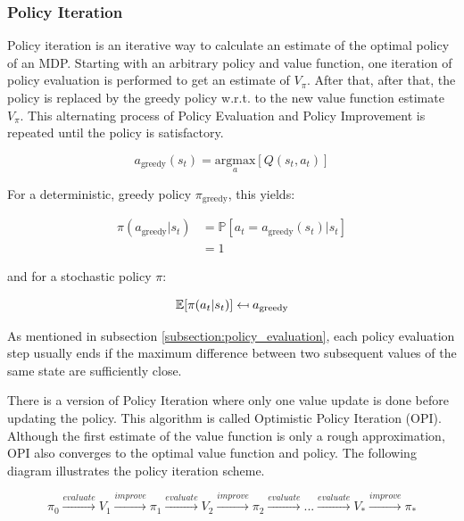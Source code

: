 \subsubsection{Policy Iteration}
\label{sec:PI}
Policy iteration is an iterative way to calculate an estimate of the optimal policy of an MDP. Starting with an arbitrary policy and value function, one iteration of policy evaluation is performed to get an estimate of $V_\pi$. After that, after that, the policy is replaced by the greedy policy w.r.t. to the new value function estimate $V_\pi$. This alternating process of Policy Evaluation and Policy Improvement is repeated until the policy is satisfactory.

\begin{equation}
a_{\text{greedy}}(s_t) = \underset{a}{\text{argmax}}[Q(s_t,a_t)]
\label{eq:get_greedy_action}
\end{equation}

For a deterministic, greedy policy $\pi_{\text{greedy}}$, this yields:

\begin{align}
\pi(a_{\text{greedy}}|s_t)&=\mathbb{P}[a_t=a_{\text{greedy}}(s_t)|s_t] \\ &=1
\end{align}

and for a stochastic policy $\pi$:

\begin{equation}
\mathbb{E}[\pi(a_t | s_t)] \mathrel{\reflectbox{\ensuremath{\mapsto}}} a_{\text{greedy}}
\end{equation}

As mentioned in subsection \ref{subsection:policy_evaluation}, each policy evaluation step usually ends if the maximum difference between two subsequent values of the same state are sufficiently close.

There is a version of Policy Iteration where only one value update is done before updating the policy. This algorithm is called Optimistic Policy Iteration (OPI). Although the first estimate of the value function is only a rough approximation, OPI also converges to the optimal value function and policy. The following diagram illustrates the policy iteration scheme.

\begin{equation*}
\pi_0 \overset{evaluate}{\longrightarrow} V_1 \overset{improve}{\longrightarrow} \pi_1 \overset{evaluate}{\longrightarrow} V_2 \overset{improve}{\longrightarrow} \pi_2 \overset{evaluate}{\longrightarrow} ... \overset{evaluate}{\longrightarrow} V_* \overset{improve}{\longrightarrow} \pi_*
\label{eq:pi_scheme}
\end{equation*}

